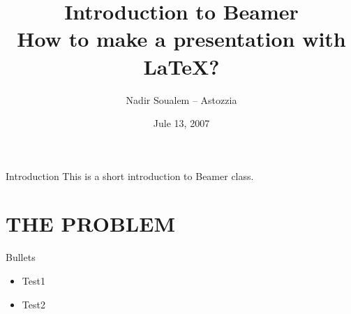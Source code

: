 \documentclass{beamer}
\title[Make a LaTeX presentation using Beamer]{Introduction  to Beamer\\How to make a presentation with LaTeX?}
\author{Nadir Soualem -- Astozzia}
\institute{Math-linux.com}
\date{Jule 13, 2007}
\begin{document}
\begin{frame}
\titlepage
\end{frame}


\begin{omeframe}{Introduction}
This is a short introduction to Beamer class.
\end{omeframe}

\section{THE PROBLEM}
\omesectionpage

\begin{glencoeframe}{Bullets}
    \begin{itemize}
        \item Test1
        \item Test2
    \end{itemize}
\end{glencoeframe}
\end{document}
